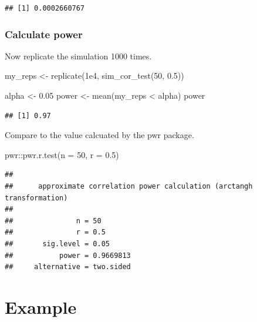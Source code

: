 \documentclass[
  oneside]{book}
\newenvironment{Shaded}{\begin{snugshade}}{\end{snugshade}}
\newcommand{\AttributeTok}[1]{\textcolor[rgb]{0.77,0.63,0.00}{#1}}
\newcommand{\DecValTok}[1]{\textcolor[rgb]{0.00,0.00,0.81}{#1}}
\newcommand{\FloatTok}[1]{\textcolor[rgb]{0.00,0.00,0.81}{#1}}
\newcommand{\FunctionTok}[1]{\textcolor[rgb]{0.00,0.00,0.00}{#1}}
\newcommand{\NormalTok}[1]{#1}
\newcommand{\OtherTok}[1]{\textcolor[rgb]{0.56,0.35,0.01}{#1}}
\newcommand{\SpecialCharTok}[1]{\textcolor[rgb]{0.00,0.00,0.00}{#1}}
\begin{document}
\begin{verbatim}
## [1] 0.0002660767
\end{verbatim}

\hypertarget{calc-power-cor}{%
\subsubsection{Calculate power}\label{calc-power-cor}}

Now replicate the simulation 1000 times.

\begin{Shaded}
\begin{Highlighting}[]
\NormalTok{my\_reps }\OtherTok{\textless{}{-}} \FunctionTok{replicate}\NormalTok{(}\FloatTok{1e4}\NormalTok{, }\FunctionTok{sim\_cor\_test}\NormalTok{(}\DecValTok{50}\NormalTok{, }\FloatTok{0.5}\NormalTok{))}

\NormalTok{alpha }\OtherTok{\textless{}{-}} \FloatTok{0.05}
\NormalTok{power }\OtherTok{\textless{}{-}} \FunctionTok{mean}\NormalTok{(my\_reps }\SpecialCharTok{\textless{}}\NormalTok{ alpha)}
\NormalTok{power}
\end{Highlighting}
\end{Shaded}

\begin{verbatim}
## [1] 0.97
\end{verbatim}

Compare to the value calcuated by the pwr package.

\begin{Shaded}
\begin{Highlighting}[]
\NormalTok{pwr}\SpecialCharTok{::}\FunctionTok{pwr.r.test}\NormalTok{(}\AttributeTok{n =} \DecValTok{50}\NormalTok{, }\AttributeTok{r =} \FloatTok{0.5}\NormalTok{)}
\end{Highlighting}
\end{Shaded}

\begin{verbatim}
## 
##      approximate correlation power calculation (arctangh transformation) 
## 
##               n = 50
##               r = 0.5
##       sig.level = 0.05
##           power = 0.9669813
##     alternative = two.sided
\end{verbatim}

\hypertarget{example}{%
\section{Example}\label{example}}
\end{document}
